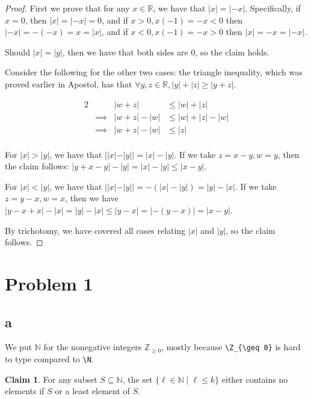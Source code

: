 \documentclass[12pt,letterpaper]{article}
\theoremstyle{definition}
\newtheorem*{claim}{Claim}
\newcommand{\R}{\mathbb{R}}
\newcommand{\Z}{\mathbb{Z}}
\newcommand{\N}{\mathbb{N}}
\begin{document}
\begin{proof}
    First we prove that for any $x \in \R$, we have that $|x| = |-x|$.
    Specifically, if $x = 0$, then $|x| = |-x| = 0$, and if $x > 0, x(-1) = -x < 0$ then 
    $|-x| = -(-x) = x = |x|$, and if $x < 0, x(-1) = -x > 0$ then
    $|x| = -x = |-x|$.

    Should $|x| = |y|$, then we have that both sides are $0$, so the claim holds.

    Consider the following for the other two cases:
    the triangle inequality, which was proved earlier in Apostol,
    has that $\forall y,z \in \R, |y|+|z| \geq |y+z|$.

    \begin{alignat*}{2}
        && |w+z| &\leq |w| + |z| \\
        &\implies& |w+z| - |w| &\leq |w| + |z| - |w| \\
        &\implies& |w+z| - |w| &\leq |z|\\
    \end{alignat*}


    For $|x| > |y|$, we have that $||x| - |y|| = |x| - |y|$.
    If we take $z = x - y, w = y$, then the claim follows:
    $|y + x - y| - |y| = |x| - |y| \leq |x - y|$.

    For $|x| < |y|$, we have that $||x| - |y|| = -(|x| - |y|) = |y| - |x|$.
    If we take $z = y - x, w = x$, then we have 
    $|y - x + x|-|x| = |y| - |x| \leq |y - x| = |-(y - x)| = |x - y|$.

    By trichotomy, we have covered all cases relating $|x|$ and $|y|$, so the claim follows.
\end{proof}

\section*{Problem 1}
\subsection*{a}

We put $\N$ for the nonegative integers $\Z_{\geq 0}$, mostly because
\verb#\Z_{\geq 0}# is hard to type compared to \verb#\N#.

\begin{claim}
    For any subset $S \subseteq \N$, the set $\{\ell \in \N \mid \ell \leq k\}$
    either contains no elements if $S$ or a least element of $S$.
\end{claim}
\end{document}
